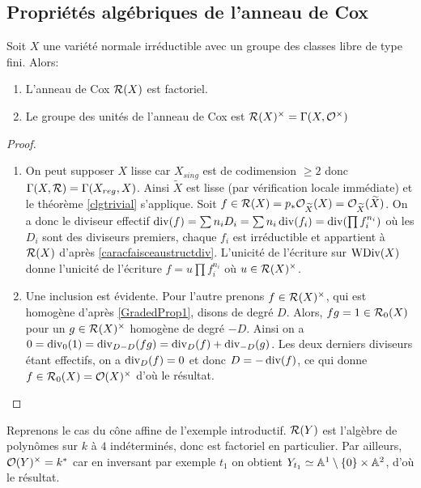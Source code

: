 \subsection{Propriétés algébriques de l'anneau de Cox}

\begin{thm}\label{coxFreeFactoriel}
Soit $X$ une variété normale irréductible avec un groupe des classes libre de type fini. Alors:
\begin{enumerate}
\item L'anneau de Cox $\mathcal{R}(X)$ est factoriel.
\item Le groupe des unités de l'anneau de Cox est $\mathcal{R}(X)^\times=\Gamma(X,\mathcal{O}^\times)$
\end{enumerate}
\end{thm}
\begin{proof}
\begin{enumerate}
\item On peut supposer $X$ lisse car $X_{sing}$ est de codimension $\geq 2$ donc $\Gamma(X, \mathcal{R})=\Gamma(X_{reg}, X)$. Ainsi $\widetilde{X}$ est lisse (par vérification locale immédiate) et le théorème \ref{clgtrivial} s'applique. Soit $f\in \mathcal{R}(X)=p_*\mathcal{O}_{\widetilde{X}}(X)=\mathcal{O}_{\widetilde{X}}(\widetilde{X})$. On a donc le diviseur effectif $\operatorname{div}(f)= \sum n_iD_i=\sum n_i\operatorname{div}(f_i)=\operatorname{div}(\prod f_i^{n_i})$ où les $D_i$ sont des diviseurs premiers, chaque $f_i$ est irréductible et appartient à $\mathcal{R}(X)$ d'après \ref{caracfaisceaustructdiv}. L'unicité de l'écriture sur $\operatorname{WDiv}(X)$ donne l'unicité de l'écriture $f=u\prod f_i^{n_i}$ où $u\in \mathcal{R}(X)^\times$.
\item Une inclusion est évidente. Pour l'autre prenons $f\in\mathcal{R}(X)^\times$, qui est homogène d'après \ref{GradedProp1}, disons de degré $D$. Alors, $fg=1\in \mathcal{R}_0(X)$ pour un $g\in\mathcal{R}(X)^\times$ homogène de degré $-D$. Ainsi on a $0=\operatorname{div}_0(1)=\operatorname{div}_{D-D}(fg)=\operatorname{div}_D(f)+\operatorname{div}_{-D}(g)$. Les deux derniers diviseurs étant effectifs, on a $\operatorname{div}_D(f)=0$ et donc $D=-\operatorname{div}(f)$, ce qui donne $f\in\mathcal{R}_0(X)=\mathcal{O}(X)^\times$ d'où le résultat.
\end{enumerate}
\end{proof}

\begin{ex}
Reprenons le cas du cône affine de l'exemple introductif.  $\mathcal{R}(Y)$ est l'algèbre de polynômes sur $k$ à $4$ indéterminés, donc est factoriel en particulier.  Par ailleurs, $\mathcal{O}(Y)^{\times}=k^*$ car en inversant par exemple $t_1$  on obtient $Y_{t_1}\simeq \mathbb{A}^{1}\setminus \lbrace0\rbrace\times\mathbb{A}^{2}$, d'où le résultat.
\end{ex}

